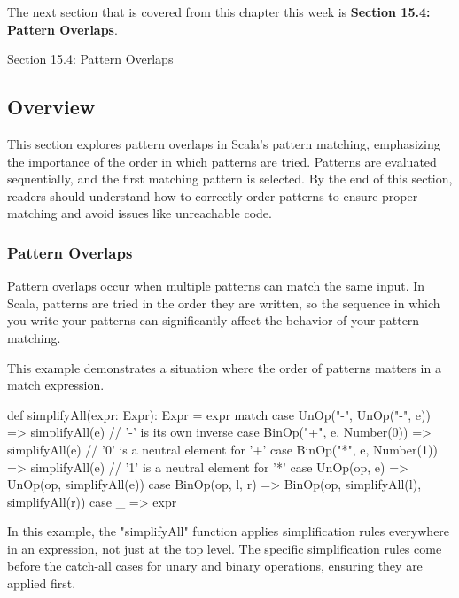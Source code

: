 The next section that is covered from this chapter this week is \textbf{Section 15.4: Pattern Overlaps}.

\begin{notes}{Section 15.4: Pattern Overlaps}
    \subsection*{Overview}

    This section explores pattern overlaps in Scala's pattern matching, emphasizing the importance of the order in which patterns are tried. Patterns are evaluated sequentially, and the first matching 
    pattern is selected. By the end of this section, readers should understand how to correctly order patterns to ensure proper matching and avoid issues like unreachable code.
    
    \subsubsection*{Pattern Overlaps}
    
    Pattern overlaps occur when multiple patterns can match the same input. In Scala, patterns are tried in the order they are written, so the sequence in which you write your patterns can significantly 
    affect the behavior of your pattern matching.
    
    \begin{highlight}
    
        This example demonstrates a situation where the order of patterns matters in a match expression.
    
    \begin{code}[Scala]
    def simplifyAll(expr: Expr): Expr = expr match {
    case UnOp("-", UnOp("-", e)) =>
        simplifyAll(e) // '-' is its own inverse
    case BinOp("+", e, Number(0)) =>
        simplifyAll(e) // '0' is a neutral element for '+'
    case BinOp("*", e, Number(1)) =>
        simplifyAll(e) // '1' is a neutral element for '*'
    case UnOp(op, e) =>
        UnOp(op, simplifyAll(e))
    case BinOp(op, l, r) =>
        BinOp(op, simplifyAll(l), simplifyAll(r))
    case _ => expr
    }
    \end{code}
    
        In this example, the "simplifyAll" function applies simplification rules everywhere in an expression, not just at the top level. The specific simplification rules come before the catch-all 
        cases for unary and binary operations, ensuring they are applied first.
    

\end{highlight}
\end{notes}
